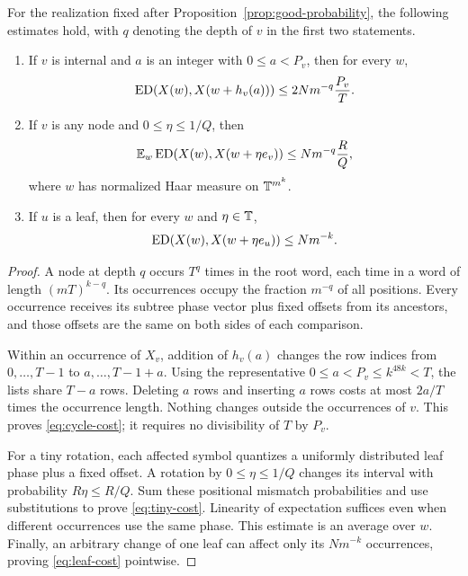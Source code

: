 \begin{lemma}\label{lem:torus-costs}
For the realization fixed after Proposition~\ref{prop:good-probability},
the following estimates hold, with $q$ denoting the depth of $v$ in
the first two statements.
\begin{enumerate}[label=(\roman*)]
\item If $v$ is internal and $a$ is an integer with $0\leq a<P_v$,
then for every $w$,
\begin{equation}\label{eq:cycle-cost}
 \operatorname{ED}(X(w),X(w+h_v(a)))\leq2Nm^{-q}\frac{P_v}{T}.
\end{equation}
\item If $v$ is any node and $0\leq\eta\leq1/Q$, then
\begin{equation}\label{eq:tiny-cost}
 \mathbb E_w\operatorname{ED}(X(w),X(w+\eta e_v))\leq Nm^{-q}\frac RQ,
\end{equation}
where $w$ has normalized Haar measure on $\mathbb T^{m^k}$.
\item If $u$ is a leaf, then for every $w$ and $\eta\in\mathbb T$,
\begin{equation}\label{eq:leaf-cost}
 \operatorname{ED}(X(w),X(w+\eta e_u))\leq Nm^{-k}.
\end{equation}
\end{enumerate}
\end{lemma}
\begin{proof}
A node at depth $q$ occurs $T^q$ times in the root word, each time in
a word of length $(mT)^{k-q}$. Its occurrences occupy the fraction
$m^{-q}$ of all positions. Every occurrence receives its subtree phase
vector plus fixed offsets from its ancestors, and those offsets are
the same on both sides of each comparison.

Within an occurrence of $X_v$, addition of $h_v(a)$ changes the row
indices from $0,\ldots,T-1$ to $a,\ldots,T-1+a$. Using the representative
$0\leq a<P_v\leq k^{48k}<T$, the lists share $T-a$ rows. Deleting $a$
rows and inserting $a$ rows costs at most $2a/T$ times the occurrence
length. Nothing changes outside the occurrences of $v$. This proves
\eqref{eq:cycle-cost}; it requires no divisibility of $T$ by $P_v$.

For a tiny rotation, each affected symbol quantizes a uniformly
distributed leaf phase plus a fixed offset. A rotation by
$0\leq\eta\leq1/Q$ changes its interval with probability
$R\eta\leq R/Q$. Sum these positional mismatch probabilities and use
substitutions to prove \eqref{eq:tiny-cost}. Linearity of expectation
suffices even when different occurrences use the same phase. This
estimate is an average over $w$. Finally, an arbitrary change of one
leaf can affect only its $Nm^{-k}$ occurrences, proving
\eqref{eq:leaf-cost} pointwise.
\end{proof}

